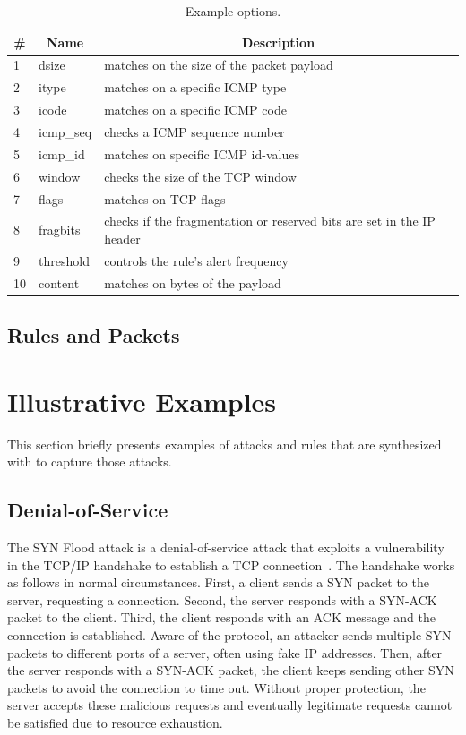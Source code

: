 \documentclass[runningheads]{llncs}
\begin{document}
\begin{table}[h]
  \caption{\label{table:rules}Example options.}  
  \centering
  \begin{tabular}{p{0.35cm}ll}
    \toprule
    \multicolumn{1}{c}{\#} & \multicolumn{1}{c}{Name} &  \multicolumn{1}{c}{Description}\\
    \midrule     
    1 & dsize & matches on the size of the packet payload\\
    2 & itype &  matches on a specific ICMP type\\
    3 & icode & matches on a specific ICMP code\\
    4 & icmp\_seq  & checks a ICMP sequence number\\
    5 & icmp\_id & matches on specific ICMP id-values\\
    6 & window & checks the size of the TCP window\\
    7 & flags & matches on TCP flags\\
    8 & fragbits & checks if the fragmentation or reserved bits are set in the IP header\\
    9 & threshold & controls the rule’s alert frequency\\
    10 & content & matches on bytes of the payload\\
    \bottomrule
  \end{tabular}
\end{table}

\subsection{Rules and Packets}



\section{Illustrative Examples}
\label{sec:suri-metas-coverage}


This section briefly presents examples of attacks and rules that are
synthesized with \tname{} to capture those attacks.


\subsection{Denial-of-Service}

The SYN Flood attack is a denial-of-service attack that exploits a vulnerability in the TCP/IP handshake
to establish a TCP connection~\cite{cloudfare-synflood}. The handshake
works as follows in normal circumstances. First, a client sends a SYN
packet to the server, requesting a connection. Second, the server
responds with a SYN-ACK packet to the client. Third, the client
responds with an ACK message and the connection is established. Aware
of the protocol, an attacker sends multiple SYN packets to different
ports of a server, often using fake IP addresses. Then, after the
server responds with a SYN-ACK packet, the client keeps sending other
SYN packets to avoid the connection to time out. Without proper
protection, the server accepts these malicious requests and eventually
legitimate requests cannot be satisfied due to resource exhaustion.
\end{document}

